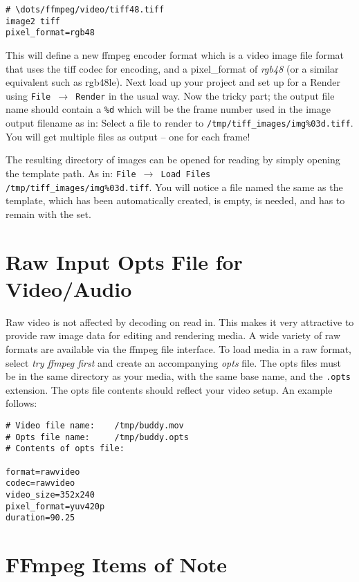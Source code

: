 \begin{lstlisting}[style=sh]
# \dots/ffmpeg/video/tiff48.tiff
image2 tiff
pixel_format=rgb48
\end{lstlisting}

This will define a new ffmpeg encoder format which is a video image file format that uses the tiff codec for encoding, and a pixel\_format of \textit{rgb48} (or a similar equivalent such as rgb48le).  Next load up your project and set up for a Render using \texttt{File $\rightarrow$ Render} in the usual way.  Now the tricky part; the output file name should contain a \texttt{\%d} which will be the frame number used in the image output filename as in:  Select a file to render to  \texttt{/tmp/tiff\_images/img\%03d.tiff}.  You will get multiple files as output -- one for each frame!

The resulting directory of images can be opened for reading by simply opening the template path.  As in: \texttt{File $\rightarrow$ Load Files} \texttt{/tmp/tiff\_images/img\%03d.tiff}.  You will notice a file named the same as the template, which has been automatically created, is empty, is needed, and has to remain with the set.

\section{Raw Input Opts File for Video/Audio}%
\label{sec:raw_input_opts_video_audio}

Raw video is not affected by decoding on read in.  This makes it very attractive to provide raw image data for editing and rendering media.  A wide variety of raw formats are available via the ffmpeg file interface.  To load media in a raw format, select \textit{try ffmpeg first} and create an accompanying \textit{opts} file.  The opts files must be in the same directory as your media, with the same base name, and the \texttt{.opts} extension.  The opts file contents should reflect your video setup.  An example follows:

\begin{lstlisting}[style=sh]
# Video file name:    /tmp/buddy.mov
# Opts file name:     /tmp/buddy.opts
# Contents of opts file:

format=rawvideo
codec=rawvideo
video_size=352x240
pixel_format=yuv420p
duration=90.25
\end{lstlisting}

\section{FFmpeg Items of Note}%
\label{sec:ffmpeg_items_note}

